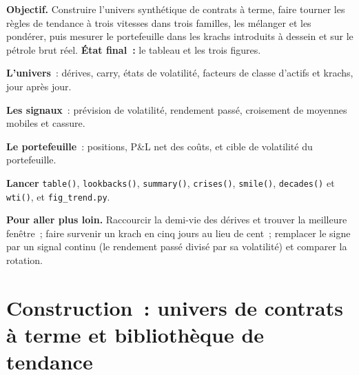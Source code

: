 \begin{tutorial}
\textbf{Objectif.} Construire l'univers synthétique de contrats à terme, faire tourner les règles de tendance à trois vitesses dans trois familles, les mélanger et les pondérer, puis mesurer le portefeuille dans
les krachs introduits à dessein et sur le pétrole brut réel. \textbf{État final~:} le tableau et les trois figures.
\begin{tutsteps}
\item \textbf{L'univers}~: dérives, carry, états de volatilité, facteurs de classe d'actifs et krachs, jour après jour.
\label{lst:s1:trend-following:synthfut}
\item \textbf{Les signaux}~: prévision de volatilité, rendement passé, croisement de moyennes mobiles et cassure.
\label{lst:s1:trend-following:signals}
\item \textbf{Le portefeuille}~: positions, P\&L net des coûts, et cible de volatilité du portefeuille.
\label{lst:s1:trend-following:book}
\item \textbf{Lancer} \texttt{table()}, \texttt{lookbacks()}, \texttt{summary()}, \texttt{crises()}, \texttt{smile()}, \texttt{decades()} et
\texttt{wti()}, et \texttt{fig\_trend.py}.
\end{tutsteps}
\textbf{Pour aller plus loin.} Raccourcir la demi-vie des dérives et trouver la meilleure fenêtre~; faire survenir un krach en cinq jours au lieu de cent~; remplacer
le signe par un signal continu (le rendement passé divisé par sa volatilité) et comparer la rotation.
\end{tutorial}

\section{Construction~: univers de contrats à terme et bibliothèque de tendance}\label{bld:s1:trend-following:trend}

